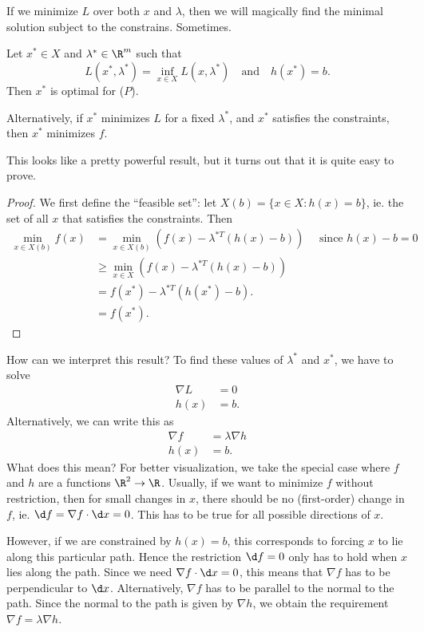 \documentclass[a4paper]{article}
\begin{document}
If we minimize $L$ over both $x$ and $\lambda$, then we will magically find the minimal solution subject to the constrains. Sometimes.

\begin{thm}
  Let $x^*\in X$ and $\lambda^*\in \R^m$ such that
  \[
    L(x^* ,\lambda^*) = \inf_{x\in X}L(x, \lambda^*)\quad\text{and}\quad h(x^*) = b.
  \]
  Then $x^*$ is optimal for ($P$).

  Alternatively, if $x^*$ minimizes $L$ for a fixed $\lambda^*$, and $x^*$ satisfies the constraints, then $x^*$ minimizes $f$.
\end{thm}
This looks like a pretty powerful result, but it turns out that it is quite easy to prove.

\begin{proof}
  We first define the ``feasible set'': let $X(b) = \{x\in X: h(x) = b\}$, ie. the set of all $x$ that satisfies the constraints. Then
  \begin{align*}
    \min_{x\in X(b)} f(x) &= \min_{x\in X(b)} (f(x) - \lambda^{*T}(h(x) - b))\quad\text{ since $h(x) - b = 0$}\\
    &\geq \min_{x\in X} (f(x) - \lambda^{*T}(h(x) - b))\\
    &= f(x^*) - \lambda^{*T}(h(x^*) - b).\\
    &= f(x^*).
  \end{align*}
\end{proof}
How can we interpret this result? To find these values of $\lambda^*$ and $x^*$, we have to solve
\begin{align*}
  \nabla L &= 0\\
  h(x) &= b.
\end{align*}
Alternatively, we can write this as
\begin{align*}
  \nabla f &= \lambda \nabla h\\
  h(x) &= b.
\end{align*}
What does this mean? For better visualization, we take the special case where $f$ and $h$ are a functions $\R^2 \to \R$. Usually, if we want to minimize $f$ without restriction, then for small changes in $x$, there should be no (first-order) change in $f$, ie. $\d f = \nabla f\cdot \d x = 0$. This has to be true for all possible directions of $x$.

However, if we are constrained by $h(x) = b$, this corresponds to forcing $x$ to lie along this particular  path. Hence the restriction $\d f = 0$ only has to hold when $x$ lies along the path. Since we need $\nabla f\cdot \d x = 0$, this means that $\nabla f$ has to be perpendicular to $\d x$. Alternatively, $\nabla f$ has to be parallel to the normal to the path. Since the normal to the path is given by $\nabla h$, we obtain the requirement $\nabla f = \lambda \nabla h$.
\end{document}

